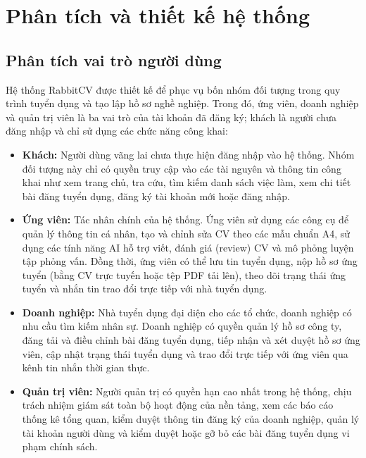 \chapter{Phân tích và thiết kế hệ thống}

\section{Phân tích vai trò người dùng}

Hệ thống RabbitCV được thiết kế để phục vụ bốn nhóm đối tượng trong quy trình tuyển dụng và tạo lập hồ sơ nghề nghiệp. Trong đó, ứng viên, doanh nghiệp và quản trị viên là ba vai trò của tài khoản đã đăng ký; khách là người chưa đăng nhập và chỉ sử dụng các chức năng công khai:

\begin{itemize}
    \item \textbf{Khách:} Người dùng vãng lai chưa thực hiện đăng nhập vào hệ thống. Nhóm đối tượng này chỉ có quyền truy cập vào các tài nguyên và thông tin công khai như xem trang chủ, tra cứu, tìm kiếm danh sách việc làm, xem chi tiết bài đăng tuyển dụng, đăng ký tài khoản mới hoặc đăng nhập.
    
    \item \textbf{Ứng viên:} Tác nhân chính của hệ thống. Ứng viên sử dụng các công cụ để quản lý thông tin cá nhân, tạo và chỉnh sửa CV theo các mẫu chuẩn A4, sử dụng các tính năng AI hỗ trợ viết, đánh giá (review) CV và mô phỏng luyện tập phỏng vấn. Đồng thời, ứng viên có thể lưu tin tuyển dụng, nộp hồ sơ ứng tuyển (bằng CV trực tuyến hoặc tệp PDF tải lên), theo dõi trạng thái ứng tuyển và nhắn tin trao đổi trực tiếp với nhà tuyển dụng.
    
    \item \textbf{Doanh nghiệp:} Nhà tuyển dụng đại diện cho các tổ chức, doanh nghiệp có nhu cầu tìm kiếm nhân sự. Doanh nghiệp có quyền quản lý hồ sơ công ty, đăng tải và điều chỉnh bài đăng tuyển dụng, tiếp nhận và xét duyệt hồ sơ ứng viên, cập nhật trạng thái tuyển dụng và trao đổi trực tiếp với ứng viên qua kênh tin nhắn thời gian thực.
    
    \item \textbf{Quản trị viên:} Người quản trị có quyền hạn cao nhất trong hệ thống, chịu trách nhiệm giám sát toàn bộ hoạt động của nền tảng, xem các báo cáo thống kê tổng quan, kiểm duyệt thông tin đăng ký của doanh nghiệp, quản lý tài khoản người dùng và kiểm duyệt hoặc gỡ bỏ các bài đăng tuyển dụng vi phạm chính sách.
\end{itemize}

